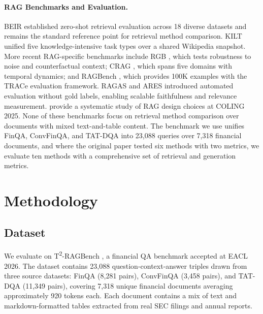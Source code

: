 \documentclass[11pt]{article}
\begin{document}
\paragraph{RAG Benchmarks and Evaluation.}
BEIR \citep{thakur2021beir} established zero-shot retrieval evaluation across 18 diverse datasets and remains the standard reference point for retrieval method comparison. KILT \citep{petroni2021kilt} unified five knowledge-intensive task types over a shared Wikipedia snapshot. More recent RAG-specific benchmarks include RGB \citep{chen2024rgb}, which tests robustness to noise and counterfactual context; CRAG \citep{yang2024crag}, which spans five domains with temporal dynamics; and RAGBench \citep{friel2024ragbench}, which provides 100K examples with the TRACe evaluation framework. RAGAS \citep{es2024ragas} and ARES \citep{saadfalcon2024ares} introduced automated evaluation without gold labels, enabling scalable faithfulness and relevance measurement. \citet{li2025ragbestpractices} provide a systematic study of RAG design choices at COLING 2025. None of these benchmarks focus on retrieval method comparison over documents with mixed text-and-table content. The benchmark we use \citep{strich2026t2ragbench} unifies FinQA, ConvFinQA, and TAT-DQA into 23,088 queries over 7,318 financial documents, and where the original paper tested six methods with two metrics, we evaluate ten methods with a comprehensive set of retrieval and generation metrics.

\section{Methodology}
\label{sec:method}

\subsection{Dataset}
\label{sec:dataset}

We evaluate on T\textsuperscript{2}-RAGBench \cite{strich2026t2ragbench}, a financial QA benchmark accepted at EACL 2026. The dataset contains 23,088 question-context-answer triples drawn from three source datasets: FinQA \cite{chen2021finqa} (8,281 pairs), ConvFinQA \cite{chen2022convfinqa} (3,458 pairs), and TAT-DQA \cite{zhu2021tatqa} (11,349 pairs), covering 7,318 unique financial documents averaging approximately 920 tokens each. Each document contains a mix of text and markdown-formatted tables extracted from real SEC filings and annual reports.
\end{document}
